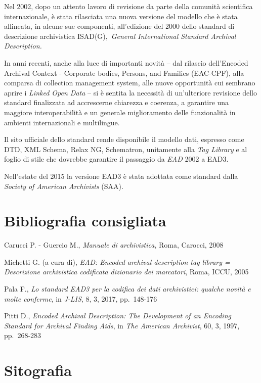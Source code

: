 \documentclass[
  b5paper,
  twoside,
  12pt,
  chapterprefix=false,
  bibliography=totocnumbered,
  parskip=false]{scrbook}
\begin{document}
Nel 2002, dopo un attento lavoro di revisione da parte della comunità
scientifica internazionale, è stata rilasciata una nuova versione del
modello che è stata allineata, in alcune sue componenti, all'edizione
del 2000 dello standard di descrizione archivistica ISAD(G),~\emph{General
International Standard Archival Description.}

In anni recenti, anche alla luce di importanti novità -- dal rilascio
dell'Encoded Archival Context - Corporate bodies, Persons, and
Families (EAC-CPF), alla comparsa di collection management system, alle
nuove opportunità cui sembrano aprire i \emph{Linked Open Data} -- si è
sentita la necessità di un'ulteriore revisione dello standard
finalizzata ad accrescerne chiarezza e coerenza, a garantire una
maggiore interoperabilità e un generale miglioramento delle funzionalità
in ambienti internazionali e multilingue.

Il sito ufficiale dello standard rende disponibile il modello dati,
espresso come DTD, XML Schema, Relax NG, Schematron, unitamente alla
\emph{Tag Library} e al foglio di stile che dovrebbe garantire il passaggio
da \emph{EAD} 2002 a EAD3.

Nell'estate del 2015 la versione EAD3 è stata adottata come standard
dalla \emph{Society of American Archivists} (SAA).

\hypertarget{bibliografia-consigliata-9}{%
\section*{Bibliografia consigliata}\label{bibliografia-consigliata-9}}

Carucci P. - Guercio M., \emph{Manuale di archivistica}, Roma, Carocci, 2008

Michetti G. (a cura di), \emph{EAD: Encoded archival description tag library
= Descrizione archivistica codificata dizionario dei marcatori}, Roma,
ICCU, 2005

Pala F., \emph{Lo standard EAD3 per la codifica dei dati archivistici:
qualche novità e molte conferme}, in \emph{J-LIS}, 8, 3, 2017, pp.~148-176

Pitti D., \emph{Encoded Archival Description: The Development of an Encoding
Standard for Archival Finding Aids}, in \emph{The American Archivist}, 60, 3,
1997, pp.~268-283

\hypertarget{sitografia-11}{%
\section*{Sitografia}\label{sitografia-11}}
\end{document}
